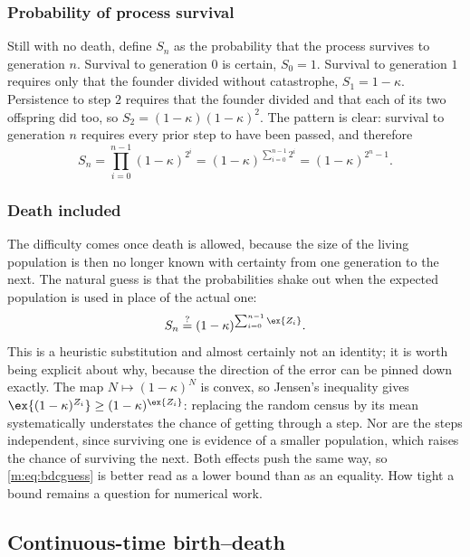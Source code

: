 \subsubsection*{Probability of process survival}

Still with no death, define $S_n$ as the probability that the process survives to
generation $n$. Survival to generation $0$ is certain, $S_0=1$. Survival to
generation $1$ requires only that the founder divided without catastrophe,
$S_1=1-\kappa$. Persistence to step $2$ requires that the founder divided and that
each of its two offspring did too, so $S_2 = (1-\kappa)(1-\kappa)^2$. The pattern
is clear: survival to generation $n$ requires every prior step to have been passed,
and therefore
\begin{equation}
\label{m:eq:bdcS}
S_n = \prod_{i=0}^{n-1}(1-\kappa)^{2^i}
= (1-\kappa)^{\sum_{i=0}^{n-1}2^i}
= (1-\kappa)^{2^n-1} .
\end{equation}

\subsubsection*{Death included}

The difficulty comes once death is allowed, because the size of the living
population is then no longer known with certainty from one generation to the next.
The natural guess is that the probabilities shake out when the expected population
is used in place of the actual one:
\begin{equation}
\label{m:eq:bdcguess}
S_n \overset{?}{=} (1-\kappa)^{\sum_{i=0}^{n-1}\ex{Z_i}} .
\end{equation}
This is a heuristic substitution and almost certainly not an identity; it is worth
being explicit about why, because the direction of the error can be pinned down
exactly. The map $N\mapsto(1-\kappa)^N$ is convex, so Jensen's inequality gives
$\ex{(1-\kappa)^{Z_i}}\ge(1-\kappa)^{\ex{Z_i}}$: replacing the random census by its
mean systematically understates the chance of getting through a step. Nor are the
steps independent, since surviving one is evidence of a smaller population, which
raises the chance of surviving the next. Both effects push the same way, so
\cref{m:eq:bdcguess} is better read as a lower bound than as an equality. How tight a
bound remains a question for numerical work.

\subsection{Continuous-time birth--death}
\label{m:sec:cts}

